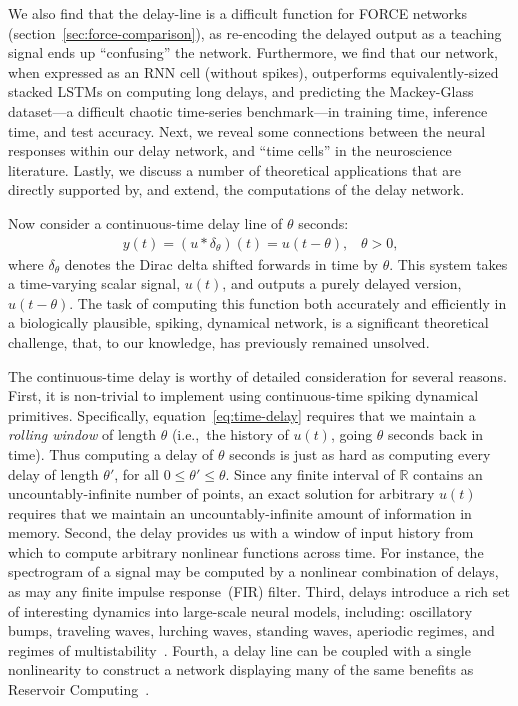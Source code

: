 We also find that the delay-line is a difficult function for FORCE networks (section~\ref{sec:force-comparison}), as re-encoding the delayed output as a teaching signal ends up ``confusing'' the network.
Furthermore, we find that our network, when expressed as an RNN cell (without spikes), outperforms equivalently-sized stacked LSTMs on computing long delays, and predicting the Mackey-Glass dataset---a difficult chaotic time-series benchmark---in training time, inference time, and test accuracy.
Next, we reveal some connections between the neural responses within our delay network, and ``time cells'' in the neuroscience literature.
Lastly, we discuss a number of theoretical applications that are directly supported by, and extend, the computations of the delay network.

Now consider a continuous-time delay line of $\theta$ seconds:
\begin{align} \label{eq:time-delay}
y(t) = (u \ast \delta_{\theta})(t) = u(t - \theta)\text{,} \quad \theta > 0 \text{,}
\end{align}
where $\delta_{\theta}$ denotes the Dirac delta shifted forwards in time by $\theta$.
This system takes a time-varying scalar signal, $u(t)$, and outputs a purely delayed version, $u(t - \theta)$.
The task of computing this function both accurately and efficiently in a biologically plausible, spiking, dynamical network, is a significant theoretical challenge, that, to our knowledge, has previously remained unsolved.

The continuous-time delay is worthy of detailed consideration for several reasons.
First, it is non-trivial to implement using continuous-time spiking dynamical primitives.
Specifically, equation~\ref{eq:time-delay} requires that we maintain a \emph{rolling window} of length $\theta$ (i.e.,~the history of $u(t)$, going $\theta$ seconds back in time).
Thus computing a delay of $\theta$ seconds is just as hard as computing every delay of length $\theta'$, for all $0 \le \theta' \le \theta$.
Since any finite interval of $\mathbb{R}$ contains an uncountably-infinite number of points, an exact solution for arbitrary $u(t)$ requires that we maintain an uncountably-infinite amount of information in memory.
Second, the delay provides us with a window of input history from which to compute arbitrary nonlinear functions across time.
For instance, the spectrogram of a signal may be computed by a nonlinear combination of delays, as may any finite impulse response~(FIR) filter.
Third, delays introduce a rich set of interesting dynamics into large-scale neural models, including: oscillatory bumps, traveling waves, lurching waves, standing waves, aperiodic regimes, and regimes of multistability~\citep{roxin2005role}.
Fourth, a delay line can be coupled with a single nonlinearity to construct a network displaying many of the same benefits as Reservoir Computing~\citep{appeltant2011information, bai2018dfr}.

